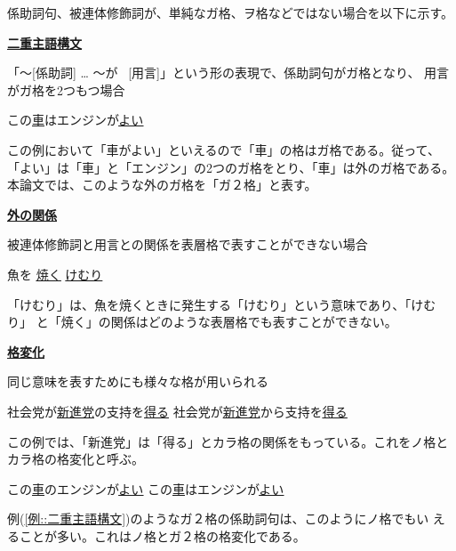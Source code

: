 \documentclass[fleqn]{nlp}
\begin{document}
\vspace*{1ex}

係助詞句、被連体修飾詞が、単純なガ格、ヲ格などではない場合を以下に示す。

\vspace*{1ex}

\noindent
\underline{\textbf{二重主語構文}}

\noindent
「〜[係助詞] … 〜が \ [用言]」という形の表現で、係助詞句がガ格となり、
用言がガ格を2つもつ場合

\begin{exe}
 \ex\label{例::二重主語構文} この\underline{車}はエンジンが\underline{\underline{よい}}
\end{exe}

この例において「車がよい」といえるので「車」の格はガ格である。従って、
「よい」は「車」と「エンジン」の2つのガ格をとり、「車」は外のガ格である。
本論文では、このような外のガ格を「ガ２格」と表す。

\vspace*{1ex}

\noindent
\underline{\textbf{外の関係}}

\noindent
被連体修飾詞と用言との関係を表層格で表すことができない場合

\begin{exe}
 \ex 魚を \underline{\underline{焼く}} \underline{けむり}
\end{exe}

「けむり」は、魚を焼くときに発生する「けむり」という意味であり、「けむり」
と「焼く」の関係はどのような表層格でも表すことができない。

\vspace*{1ex}

\noindent
\underline{\textbf{格変化}}

\noindent
同じ意味を表すためにも様々な格が用いられる

\begin{exe}
 \ex
 \begin{xlist}
  \ex 社会党が\underline{新進党}の支持を\underline{\underline{得る}}
  \ex 社会党が\underline{新進党}から支持を\underline{\underline{得る}}
 \end{xlist}
\end{exe}
この例では、「新進党」は「得る」とカラ格の関係をもっている。これをノ格と
カラ格の格変化と呼ぶ。

\begin{exe}
 \ex
 \begin{xlist}
  \ex この\underline{車}のエンジンが\underline{\underline{よい}} 
  \ex この\underline{車}はエンジンが\underline{\underline{よい}}
 \end{xlist}
\end{exe}
例(\ref{例::二重主語構文})のようなガ２格の係助詞句は、このようにノ格でもい
えることが多い。これはノ格とガ２格の格変化である。
\end{document}
